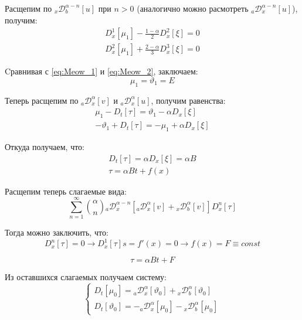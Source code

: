\documentclass[a4paper, fontsize=14pt]{article}
\newcommand{\RLD}[3]{{}_{#1}\mathcal{D}_{#2}^{\alpha} \left[#3\right]} %
\newcommand{\D}[3]{D_{#1}^{#2} \left[ #3 \right]} %
\newcommand{\RLDa}[4]{{}_{#1}\mathcal{D}_{#2}^{#4} \left[#3\right]} %
\begin{document}
Расщепим по $\RLDa{x}{b}{u}{\alpha - n}$ при $n > 0$ (аналогично можно расмотреть $\RLDa{a}{x}{u}{\alpha - n}$), получим:
\begin{gather*}
  \label{eq:Gav_1}\D{x}{1}{\mu_1} - \frac{1 - \alpha}{2} \D{x}{2}{\xi} = 0 \\
  \label{eq:Gav_2}\D{x}{2}{\mu_1} + \frac{2 - \alpha}{3} \D{x}{3}{\xi} = 0
\end{gather*}

Cравнивая с \eqref{eq:Meow_1} и \eqref{eq:Meow_2}, заключаем:
\begin{equation*}
  \mu_1 = \vartheta _1 = E
\end{equation*}

Теперь расщепим по $\RLD{a}{x}{v}$ и $\RLD{a}{x}{u}$, получим равенства:
\begin{gather}
  \mu_1 - \D{t}{}{\tau} = \vartheta _1 - \alpha \D{x}{}{\xi} \\
  -\vartheta _1 + \D{t}{}{\tau} = - \mu_1 + \alpha \D{x}{}{\xi}
\end{gather}

Откуда получаем, что:
\begin{equation}
  \begin{aligned}
    \D{t}{}{\tau} = \alpha \D{x}{}{\xi} = \alpha B \\
    \tau = \alpha B t + f(x)
  \end{aligned}
\end{equation}

Расщепим теперь слагаемые вида:
\begin{equation*}
  \sum_{n=1}^{\infty} \binom{\alpha}{n} \RLDa{a}{x}{\RLD{a}{x}{v} + \RLD{x}{b}{v}}{\alpha-n} \D{x}{n}{\tau}
\end{equation*}

Тогда можно заключить, что:
\begin{equation*}
  \D{x}{n}{\tau} = 0 \rightarrow \D{x}{1}{\tau}s = f'(x) = 0 \rightarrow f(x) = F \equiv const
\end{equation*}

\begin{equation}
  \tau = \alpha B t + F
\end{equation}

Из оставшихся слагаемых получаем систему:
\begin{equation}
  \label{eq:infinity_group}
  \begin{cases}
    \D{t}{}{\mu_0} = \RLD{a}{x}{\vartheta_0} + \RLD{x}{b}{\vartheta_0} \\
    \D{t}{}{\vartheta_0} = - \RLD{a}{x}{\mu_0} - \RLD{x}{b}{\mu_0}
  \end{cases}
\end{equation}
\end{document}
